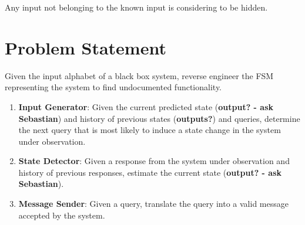\documentclass[11pt, a4paper]{article}
\begin{document}
Any input not belonging to the known input is considering to be hidden.

\section*{Problem Statement} 

Given the input alphabet of a black box system, reverse engineer the FSM representing the system to find undocumented functionality.

\begin{enumerate}
    \item \textbf{Input Generator}: Given the current predicted state (\textbf{output? - ask Sebastian}) and history of previous states (\textbf{outputs?}) and queries, determine the next query that is most likely to induce a state change in the system under observation.
    \item \textbf{State Detector}: Given a response from the system under observation and history of previous responses, estimate the current state (\textbf{output? - ask Sebastian}).
    \item \textbf{Message Sender}: Given a query, translate the query into a valid message accepted by the system.
\end{enumerate}

\nocite*{}
{}

\end{document}
